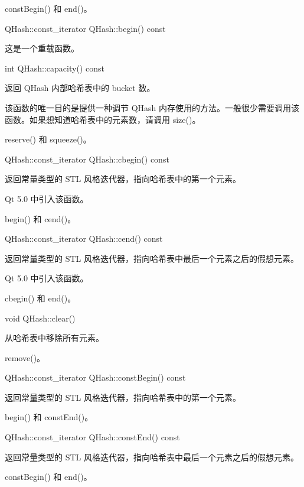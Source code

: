 \begin{notice}[另请参阅]
constBegin() 和 end()。
\end{notice}

QHash::const\_iterator QHash::begin() const

这是一个重载函数。

int QHash::capacity() const

返回 QHash 内部哈希表中的 bucket 数。

该函数的唯一目的是提供一种调节 QHash 内存使用的方法。一般很少需要调用该函数。如果想知道哈希表中的元素数，请调用 size()。

\begin{notice}[另请参阅]
reserve() 和 squeeze()。
\end{notice}

QHash::const\_iterator QHash::cbegin() const

返回常量类型的 STL 风格迭代器，指向哈希表中的第一个元素。

Qt 5.0 中引入该函数。

\begin{notice}[另请参阅]
begin() 和 cend()。
\end{notice}

QHash::const\_iterator QHash::cend() const

返回常量类型的 STL 风格迭代器，指向哈希表中最后一个元素之后的假想元素。

Qt 5.0 中引入该函数。

\begin{notice}[另请参阅]
cbegin() 和 end()。
\end{notice}

void QHash::clear()

从哈希表中移除所有元素。

\begin{notice}[另请参阅]
remove()。
\end{notice}


QHash::const\_iterator QHash::constBegin() const

返回常量类型的 STL 风格迭代器，指向哈希表中的第一个元素。


\begin{notice}[另请参阅]
begin() 和 constEnd()。
\end{notice}

QHash::const\_iterator QHash::constEnd() const

返回常量类型的 STL 风格迭代器，指向哈希表中最后一个元素之后的假想元素。

\begin{notice}[另请参阅]
constBegin() 和 end()。
\end{notice}

